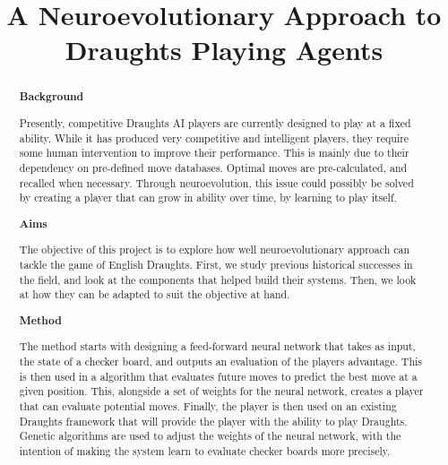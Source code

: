 \documentclass[12pt,a4paper]{article}
\title{A Neuroevolutionary Approach to Draughts Playing Agents}
\author{}
\date{}
\begin{document}
    \maketitle


\begin{abstract}


    {\bf Background}

    Presently, competitive Draughts AI players are currently designed to play at a fixed ability. While it has produced very competitive and intelligent players, they require some human intervention to improve their performance. 
    This is mainly due to their dependency on pre-defined move databases. Optimal moves are pre-calculated, and recalled when necessary. Through neuroevolution, this issue could possibly be solved by creating a player that can grow in ability over time, by learning to play itself.
    
    {\bf Aims}

    The objective of this project is to explore how well neuroevolutionary approach can tackle the game of English Draughts. First, we study previous historical successes in the field, and look at the components that helped build their systems. Then, we look at how they can be adapted to suit the objective at hand. 

    {\bf Method}

    The method starts with designing a feed-forward neural network that takes as input, the state of a checker board, and outputs an evaluation of the players advantage. This is then used in a algorithm that evaluates future moves to predict the best move at a given position. This, alongside a set of weights for the neural network, creates a player that can evaluate potential moves. Finally, the player is then used on an existing Draughts framework that will provide the player with the ability to play Draughts. Genetic algorithms are used to adjust the weights of the neural network, with the intention of making the system learn to evaluate checker boards more precisely. 
    

\end{abstract}
\end{document}
